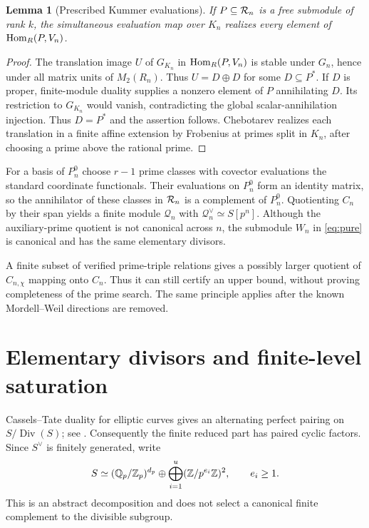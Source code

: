 \documentclass[11pt,a4paper]{article}
\newtheorem{lemma}[theorem]{Lemma}
\theoremstyle{definition}\newtheorem{definition}[theorem]{Definition}
\theoremstyle{remark}\newtheorem{remark}[theorem]{Remark}
\numberwithin{equation}{section}
\begin{document}
\begin{lemma}[Prescribed Kummer evaluations]\label{lem:kummer}
If $P\subseteq\mathcal R_n$ is a free submodule of rank $k$, the simultaneous evaluation map over $K_n$ realizes every element of $\operatorname{Hom}_R(P,V_n)$.
\end{lemma}
\begin{proof}
The translation image $U$ of $G_{K_n}$ in $\operatorname{Hom}_R(P,V_n)$ is stable under $G_n$, hence under all matrix units of $M_2(R_n)$. Thus $U=D\oplus D$ for some $D\subseteq P^*$. If $D$ is proper, finite-module duality supplies a nonzero element of $P$ annihilating $D$. Its restriction to $G_{K_n}$ would vanish, contradicting the global scalar-annihilation injection. Thus $D=P^*$ and the assertion follows. Chebotarev realizes each translation in a finite affine extension by Frobenius at primes split in $K_n$, after choosing a prime above the rational prime.\end{proof}
For a basis of $P_n^0$ choose $r-1$ prime classes with covector evaluations the standard coordinate functionals. Their evaluations on $P_n^0$ form an identity matrix, so the annihilator of these classes in $\mathcal R_n$ is a complement of $P_n^0$. Quotienting $C_n$ by their span yields a finite module $\mathscr Q_n$ with $\mathscr Q_n^\vee\simeq S[p^n]$. Although the auxiliary-prime quotient is not canonical across $n$, the submodule $W_n$ in \eqref{eq:pure} is canonical and has the same elementary divisors.

A finite subset of verified prime-triple relations gives a possibly larger quotient of $C_{n,\chi}$ mapping onto $C_n$. Thus it can still certify an upper bound, without proving completeness of the prime search. The same principle applies after the known Mordell--Weil directions are removed.


\section{Elementary divisors and finite-level saturation}
Cassels--Tate duality for elliptic curves gives an alternating perfect pairing on $S/\operatorname{Div}(S)$; see \cite{PS,Milne}. Consequently the finite reduced part has paired cyclic factors. Since $S^\vee$ is finitely generated, write
\begin{equation}\label{eq:structure}
S\simeq(\mathbb Q_p/\mathbb Z_p)^{d_p}\oplus\bigoplus_{i=1}^{u}(\mathbb Z/p^{e_i}\mathbb Z)^2,
\qquad e_i\ge1.
\end{equation}
This is an abstract decomposition and does not select a canonical finite complement to the divisible subgroup.
\end{document}
